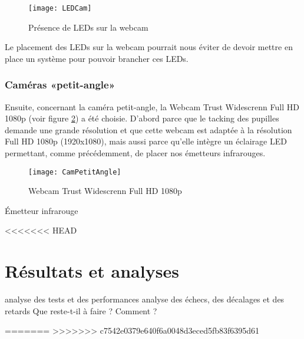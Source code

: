 \begin{figure}[H]
  \centering
  \texttt{[image: LEDCam]}
  \caption{Présence de LEDs sur la webcam}
  \label{fig:LEDCam}
\end{figure}

Le placement des LEDs sur la webcam pourrait nous éviter de devoir mettre en place un système pour pouvoir brancher ces LEDs.


\subsection{Caméras «petit-angle»}

Ensuite, concernant la caméra petit-angle, la Webcam Trust Widescrenn Full HD 1080p (voir figure \ref{fig:CamPetitAngle}) a été choisie. D'abord parce que le tacking des pupilles demande une grande résolution et que cette webcam est adaptée à la résolution Full HD 1080p (1920x1080), mais aussi parce qu'elle intègre un éclairage LED permettant, comme précédemment, de placer nos émetteurs infrarouges.

\begin{figure}[H]
  \centering
  \texttt{[image: CamPetitAngle]}
  \caption{Webcam Trust Widescrenn Full HD 1080p}
  \label{fig:CamPetitAngle}
\end{figure}Émetteur infrarouge



<<<<<<< HEAD

\chapter{Résultats et analyses}

analyse des tests et des performances
analyse des échecs, des décalages et des retards
Que reste-t-il à faire ? Comment ?


=======
>>>>>>> c7542e0379e640f6a0048d3eced5fb83f6395d61
